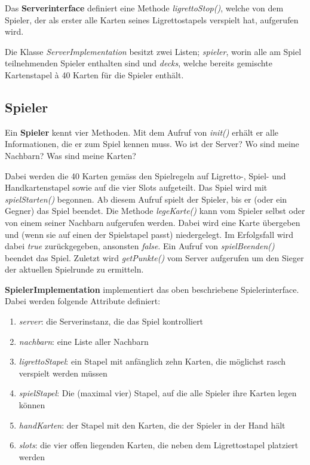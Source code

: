 Das \textbf{Serverinterface} definiert eine Methode \textit{ligrettoStop()}, welche von dem Spieler, der als erster alle Karten seines Ligrettostapels verspielt hat, aufgerufen wird.



Die Klasse \textit{ServerImplementation} besitzt zwei Listen; \textit{spieler}, worin alle am Spiel teilnehmenden Spieler enthalten sind und \textit{decks}, welche bereits gemischte Kartenstapel à 40 Karten für die Spieler enthält.



\newpage

\subsection{Spieler}

Ein \textbf{Spieler} kennt vier Methoden. Mit dem Aufruf von \textit{init()} erhält er alle Informationen, die er zum Spiel kennen muss. Wo ist der Server? Wo sind meine Nachbarn? Was sind meine Karten?

Dabei werden die 40 Karten gemäss den Spielregeln auf Ligretto-, Spiel- und Handkartenstapel sowie auf die vier Slots aufgeteilt. Das Spiel wird mit \textit{spielStarten()} begonnen. Ab diesem Aufruf spielt der Spieler, bis er (oder ein Gegner) das Spiel beendet. Die Methode \textit{legeKarte()} kann vom Spieler selbst oder von einem seiner Nachbarn aufgerufen werden. Dabei wird eine Karte übergeben und (wenn sie auf einen der Spielstapel passt) niedergelegt. Im Erfolgsfall wird dabei \textit{true} zurückgegeben, ansonsten \textit{false}. Ein Aufruf von \textit{spielBeenden()} beendet das Spiel. Zuletzt wird \textit{getPunkte()} vom Server aufgerufen um den Sieger der aktuellen Spielrunde zu ermitteln.



\newpage

\textbf{SpielerImplementation} implementiert das oben beschriebene Spielerinterface. Dabei werden folgende Attribute definiert: 

\begin{enumerate}
	\item\textit{server}: die Serverinstanz, die das Spiel kontrolliert
	\item\textit{nachbarn}: eine Liste aller Nachbarn
	\item\textit{ligrettoStapel}: ein Stapel mit anfänglich zehn Karten, die möglichst rasch verspielt werden müssen
	\item\textit{spielStapel}: Die (maximal vier) Stapel, auf die alle Spieler ihre Karten legen können
	\item\textit{handKarten}: der Stapel mit den Karten, die der Spieler in der Hand hält
	\item\textit{slots}: die vier offen liegenden Karten, die neben dem Ligrettostapel platziert werden
\end{enumerate}


